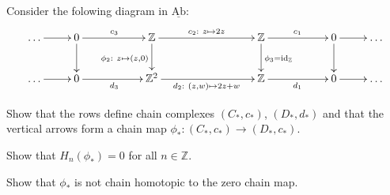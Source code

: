 \documentclass[11pt]{book}
\numberwithin{dummy}{section}
\theoremstyle{nonumberbreak}
\newenvironment{prob}[1][]{\ifthenelse{\equal{#1}{}}{\problem}{\problem[#1]}\rm}{\endproblem}
\newcommand{\Ab}{\underline{\mathrm{Ab}}}
\newcommand{\la}{\longrightarrow}
\newcommand{\id}{\mathrm{id}}
\newcommand{\Z}{\mathbb{Z}}
\begin{document}
\begin{spacing}{1.4}
\begin{prob}    %
Consider the folowing diagram in $\Ab$:
$$
\begin{xy}
\xymatrix{
\ldots \ar[r] & 0 \ar[d] \ar[rr]^{c_3} && \Z \ar[rrr]^{c_2:\ z \mapsto 2z} \ar[d]_{\phi_2: \ z \mapsto (z,0)} &&& \Z \ar[d]^{\phi_3=\id_{\Z}} \ar[rr]^{c_1} && 0 \ar[r] \ar[d] & \ldots \\
\ldots \ar[r] & 0 \ar[rr]_{d_3} && \Z^2 \ar[rrr]_{d_2:\ (z,w) \mapsto 2z+w} &&& \Z \ar[rr]_{d_1} && 0 \ar[r] & \ldots 
}
\end{xy}
$$
\begin{compactenum}
\item Show that the rows define chain complexes $(C_*,c_*)$, $(D_*,d_*)$ and that the vertical arrows form a chain map $\phi_*:(C_*,c_*) \la (D_*,c_*)$. 
\item Show that $H_n(\phi_*)=0$ for all $n \in \Z$. 
\item Show that $\phi_*$ is not chain homotopic to the zero chain map.

\end{compactenum}


\end{prob}
\end{spacing}
\end{document}
